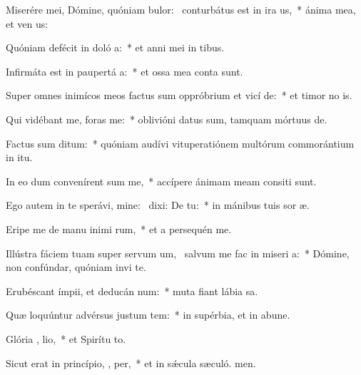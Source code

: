 \item Miserére mei, Dómine, quóniam bulor:~\pscross{} conturbátus est in ira  us,~* ánima mea, et ven us:
\item Quóniam defécit in doló  a:~* et anni mei in tibus.
\item Infirmáta est in paupertá  a:~* et ossa mea conta sunt.
\item Super omnes inimícos meos factus sum oppróbrium et vicí  de:~* et timor no is.
\item Qui vidébant me, foras   me:~* oblivióni datus sum, tamquam mórtuus  de.
\item Factus sum   ditum:~* quóniam audívi vituperatiónem multórum commorántium in itu.
\item In eo dum convenírent  sum me,~* accípere ánimam meam consiti sunt.
\item Ego autem in te sperávi, mine:~\pscross{} dixi: De   tu:~* in mánibus tuis sor æ.
\item Eripe me de manu inimi rum,~* et a persequén me.
\item Illústra fáciem tuam super servum um,~\pscross{} salvum me fac in miseri a:~* Dómine, non confúndar, quóniam invi te.
\item Erubéscant ímpii, et deducán  num:~* muta fiant lábia sa.
\item Quæ loquúntur advérsus justum tem:~* in supérbia, et in abune.
\item Glória ,  lio,~* et Spirítu to.
\item Sicut erat in princípio,  ,  per,~* et in sǽcula sæculó. men.
